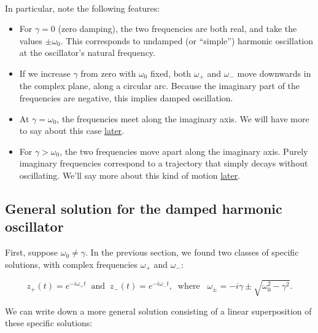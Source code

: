 \documentclass[11pt]{article}
\providecommand{\tightlist}{%
      \setlength{\itemsep}{0pt}\setlength{\parskip}{0pt}}
\begin{document}
    \begin{center}
    \end{center}
    { \hspace*{\fill} \\}
    
    In particular, note the following features:

\begin{itemize}
\tightlist
\item
  For \(\gamma = 0\) (zero damping), the two frequencies are both real,
  and take the values \(\pm \omega_0\). This corresponds to undamped (or
  ``simple'') harmonic oscillation at the oscillator's natural
  frequency.
\item
  If we increase \(\gamma\) from zero with \(\omega_0\) fixed, both
  \(\omega_+\) and \(\omega_-\) move downwards in the complex plane,
  along a circular arc. Because the imaginary part of the frequencies
  are negative, this implies damped oscillation.
\item
  At \(\gamma = \omega_0\), the frequencies meet along the imaginary
  axis. We will have more to say about this case
  \protect\hyperlink{critical_damping}{later}.
\item
  For \(\gamma > \omega_0\), the two frequencies move apart along the
  imaginary axis. Purely imaginary frequencies correspond to a
  trajectory that simply decays without oscillating. We'll say more
  about this kind of motion \protect\hyperlink{overdamped}{later}.
\end{itemize}

    \subsection{General solution for the damped harmonic
oscillator}\label{general-solution-for-the-damped-harmonic-oscillator}

First, suppose \(\omega_0 \ne \gamma\). In the previous section, we
found two classes of specific solutions, with complex frequencies
\(\omega_+\) and \(\omega_-\):

\[z_+(t) = e^{-i\omega_+ t} \;\;\mathrm{and}\;\; z_-(t) = e^{-i\omega_- t}, \;\;\mathrm{where}\;\;\; \omega_\pm = -i\gamma \pm \sqrt{\omega_0^2 - \gamma^2}.\]

We can write down a more general solution consisting of a linear
superposition of these specific solutions:
\end{document}

